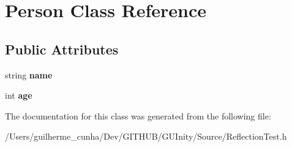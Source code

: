 \hypertarget{class_person}{}\section{Person Class Reference}
\label{class_person}
\subsection*{Public Attributes}
\begin{DoxyCompactItemize}
\item 
\hypertarget{class_person_a669b64897b4d823a27bb5866368d4dfa}{}string {\bfseries name}\label{class_person_a669b64897b4d823a27bb5866368d4dfa}

\item 
\hypertarget{class_person_acf9db1a60683f40b20ae569d29852d69}{}int {\bfseries age}\label{class_person_acf9db1a60683f40b20ae569d29852d69}

\end{DoxyCompactItemize}


The documentation for this class was generated from the following file\+:\begin{DoxyCompactItemize}
\item 
/\+Users/guilherme\+\_\+cunha/\+Dev/\+G\+I\+T\+H\+U\+B/\+G\+U\+Inity/\+Source/Reflection\+Test.\+h\end{DoxyCompactItemize}
